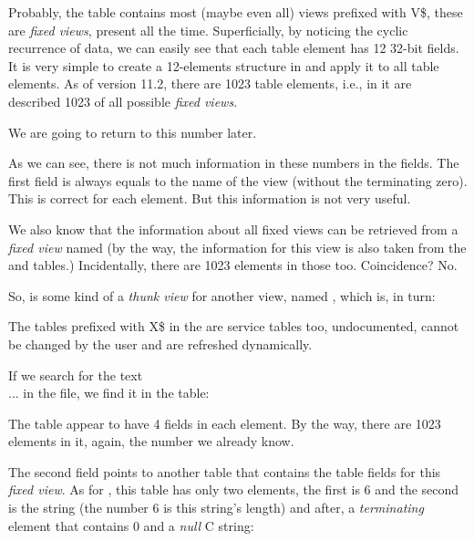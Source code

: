 Probably, the table  contains most (maybe even all) views prefixed with V\$, these are \emph{fixed views}, present all the time.
Superficially, by noticing the cyclic recurrence of data, we can easily see that each  table element has 12 32-bit fields.
It is very simple to create a 12-elements structure in \IDA and apply it to all table elements.
As of \oracle version 11.2, there are 1023 table elements, i.e., in it are described 1023 of all possible \emph{fixed views}.

We are going to return to this number later.

As we can see, there is not much information in these numbers in the fields. The first field is always equals to the name of the view (without the terminating zero).
This is correct for each element. But this information is not very useful.

We also know that the information about all fixed views can be retrieved from a \emph{fixed view} named 
(by the way, the information for this view is also taken from the  and  tables.)
Incidentally, there are 1023 elements in those too. Coincidence? No.



So,  is some kind of a \emph{thunk view} for another view, named , which is, in turn:



The tables prefixed with X\$ in the \oracle are service tables too, undocumented, cannot be changed by the user and are refreshed dynamically.

If we search for the text \\

...  in the  file, we find it in the  table:



The table appear to have 4 fields in each element. By the way, there are 1023 elements in it, again, the number we already know.

The second field points to another table that contains the table fields for this \emph{fixed view}.
As for , this table has only two elements, the first is 6 and the second is 
the  string (the number 6 is this string's length) and after, a \emph{terminating} element that contains 
0 and a \emph{null} C string:

